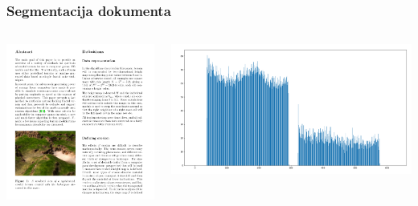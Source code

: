 \documentclass{beamer}
\begin{document}
\begin{frame}
	\frametitle{Segmentacija dokumenta}
	\begin{columns}
		\begin{column}{0.5\textwidth}
			\includegraphics[width=\textwidth]{./png/segmentation-example.png}
		\end{column}
		\begin{column}{0.5\textwidth}
			\includegraphics[width=\textwidth]{./png/segmentation-histogram.png}
		\end{column}
	\end{columns}
\end{frame}
\end{document}
